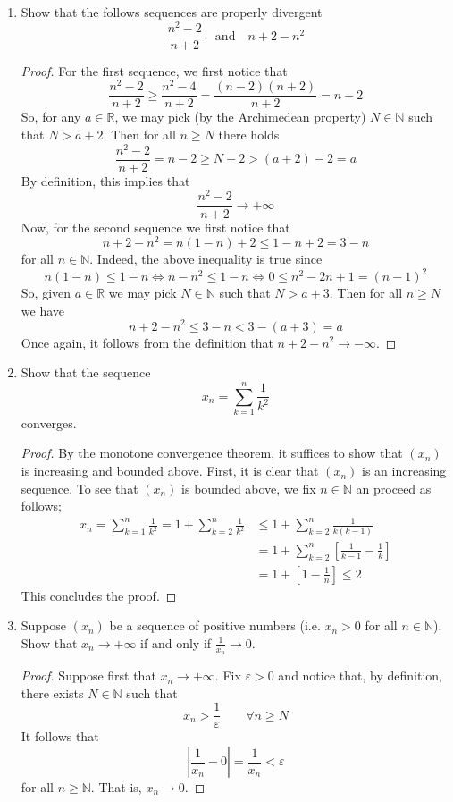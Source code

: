 \documentclass[12pt, reqno]{article}
\numberwithin{equation}{section}
\theoremstyle{definition}
\theoremstyle{remark}
\newcommand{\NN}{\mathbb{N}}
\newcommand{\RR}{\mathbb{R}}
\newcommand{\abs}[1]{\left\lvert#1\right\rvert}
\renewcommand{\epsilon}{\varepsilon}
\begin{document}
\begin{enumerate}[leftmargin=*]
	\item Show that the follows sequences are properly divergent
	      \[
		      \frac{n^2-2}{n+2}
		      \quad\text{and}\quad
		      n + 2 - n^2
	      \]
	      \begin{proof}
		      For the first sequence, we first notice that
		      \[
			      \frac{n^2-2}{n+2} \geq \frac{n^2-4}{n+2} = \frac{(n-2)(n+2)}{n+2} = n-2
		      \]
		      So, for any $a\in \RR$, we may pick (by the Archimedean property) $N\in \NN$ such that $N > a+2$. Then for all $n\geq N$ there holds
		      \[
			      \frac{n^2-2}{n+2} = n - 2 \geq N-2 > (a+2)-2 = a
		      \]
		      By definition, this implies that
		      \[
			      \frac{n^2-2}{n+2} \to + \infty
		      \]
		      Now, for the second sequence we first notice that
		      \[
			      n + 2 - n^2 = n(1-n) + 2 \leq 1-n+2 = 3-n
		      \]
		      for all $n\in \NN$. Indeed, the above inequality is true since
		      \[
			      n(1-n) \leq 1-n \iff n-n^2 \leq 1-n \iff 0 \leq n^2-2n+1 = (n-1)^2
		      \]
		      So, given $a\in \RR$ we may pick $N\in \NN$ such that $N > a+3$. Then for all $n\geq N$ we have
		      \[
			      n + 2 - n^2 \leq 3 - n < 3 - (a+3) = a
		      \]
		      Once again, it follows from the definition that $n+2-n^2 \to - \infty$.
	      \end{proof}

	\item Show that the sequence
	      \[
		      x_n = \sum_{k=1}^{n}\frac{1}{k^2}
	      \]
	      converges.

	      \begin{proof}
		      By the monotone convergence theorem, it suffices to show that $(x_n)$ is increasing and bounded above. First, it is clear that $(x_n)$ is an increasing sequence. To see that $(x_n)$ is bounded above, we fix $n\in \NN$ an proceed as follows;
		      \begin{align*}
			      x_n = \sum_{k=1}^{n}\frac{1}{k^2}
			      = 1 + \sum_{k=2}^{n}\frac{1}{k^2}
			       & \leq 1 + \sum_{k=2}^{n}\frac{1}{k(k-1)}                      \\
			       & = 1 + \sum_{k=2}^{n}\left[\frac{1}{k-1} - \frac{1}{k}\right] \\
			       & = 1+ \left[1 - \frac{1}{n}\right] \leq 2
		      \end{align*}
		      This concludes the proof.
	      \end{proof}

	\item Suppose $(x_n)$ be a sequence of positive numbers (i.e. $x_n>0$ for all $n\in \NN$). Show that $x_n \to +\infty$ if and only if $\frac{1}{x_n} \to 0$.
	      \begin{proof}
		      Suppose first that $x_n \to +\infty$. Fix $\epsilon > 0$ and notice that, by definition, there exists $N\in \NN$ such that
		      \[
			      x_n > \frac{1}{\epsilon} \qquad \forall n\geq N
		      \]
		      It follows that
		      \[
			      \abs{\frac{1}{x_n} - 0} = \frac{1}{x_n} < \epsilon
		      \]
		      for all $n\geq \NN$. That is, $x_n \to 0$.


\end{proof}
\end{enumerate}
\end{document}
